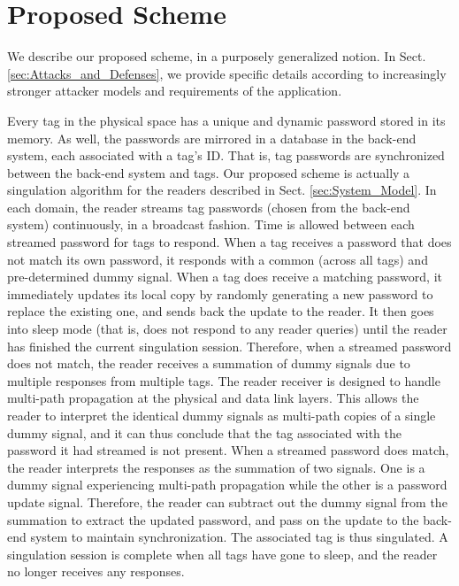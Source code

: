 \section{Proposed Scheme}
\label{sec:Proposed_Scheme}
We describe our proposed scheme, in a purposely generalized notion.  In Sect. \ref{sec:Attacks_and_Defenses}, we provide specific details according to increasingly stronger attacker models and requirements of the application.

Every tag in the physical space has a unique and dynamic password stored in its memory.  As well, the passwords are mirrored in a database in the back-end system, each associated with a tag's ID.  That is, tag passwords are synchronized between the back-end system and tags.  Our proposed scheme is actually a singulation algorithm for the readers described in Sect. \ref{sec:System_Model}.  In each domain, the reader streams tag passwords (chosen from the back-end system) continuously, in a broadcast fashion.  Time is allowed between each streamed password for tags to respond.  When a tag receives a password that does not match its own password, it responds with a common (across all tags) and pre-determined dummy signal.  When a tag does receive a matching password, it immediately updates its local copy by randomly generating a new password to replace the existing one, and sends back the update to the reader.  It then goes into sleep mode (that is, does not respond to any reader queries) until the reader has finished the current singulation session.  Therefore, when a streamed password does not match, the reader receives a summation of dummy signals due to multiple responses from multiple tags.  The reader receiver is designed to handle multi-path propagation at the physical and data link layers.  This allows the reader to interpret the identical dummy signals as multi-path copies of a single dummy signal, and it can thus conclude that the tag associated with the password it had streamed is not present.  When a streamed password does match, the reader interprets the responses as the summation of two signals.  One is a dummy signal experiencing multi-path propagation while the other is a password update signal.  Therefore, the reader can subtract out the dummy signal from the summation to extract the updated password, and pass on the update to the back-end system to maintain synchronization.  The associated tag is thus singulated.  A singulation session is complete when all tags have gone to sleep, and the reader no longer receives any responses.

